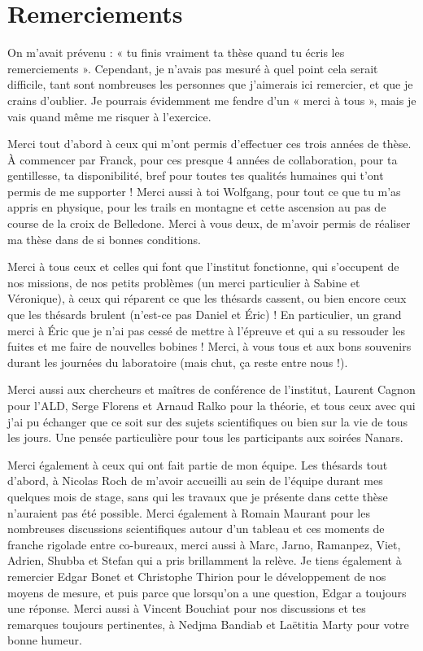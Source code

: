 \section*{Remerciements}

On m'avait prévenu : « tu finis vraiment ta thèse quand tu écris les remerciements ». Cependant, je n'avais pas mesuré à quel point cela serait difficile, tant sont nombreuses les personnes que j'aimerais ici remercier, et que je crains d'oublier. Je pourrais évidemment me fendre d'un « merci à tous », mais je vais quand même me risquer à l'exercice.


Merci tout d'abord à ceux qui m'ont permis d'effectuer ces trois années de thèse. À commencer par Franck, pour ces presque 4 années de collaboration, pour ta gentillesse, ta disponibilité, bref pour toutes tes qualités humaines qui t'ont permis de me supporter ! Merci aussi à toi Wolfgang, pour tout ce que tu m'as appris en physique, pour les trails en montagne et cette ascension au pas de course de la croix de Belledone. Merci à vous deux, de m'avoir permis de réaliser ma thèse dans de si bonnes conditions.


Merci à tous ceux et celles qui font que l'institut fonctionne, qui s'occupent de nos missions, de nos petits problèmes (un merci particulier à Sabine et Véronique), à ceux qui réparent ce que les thésards cassent, ou bien encore ceux que les thésards brulent (n'est-ce pas Daniel et Éric) ! En particulier, un grand merci à Éric que je n'ai pas cessé de mettre à l'épreuve et qui a su ressouder les fuites et me faire de nouvelles bobines ! Merci, à vous tous et aux bons souvenirs durant les journées du laboratoire (mais chut, ça reste entre nous !).


Merci aussi aux chercheurs et maîtres de conférence de l'institut, Laurent Cagnon pour l'ALD, Serge Florens et Arnaud Ralko pour la théorie, et tous ceux avec qui j'ai pu échanger que ce soit sur des sujets scientifiques ou bien sur la vie de tous les jours. Une pensée particulière pour tous les participants aux soirées Nanars.


Merci également à ceux qui ont fait partie de mon équipe. Les thésards tout d'abord, à Nicolas Roch de m'avoir accueilli au sein de l'équipe durant mes quelques mois de stage, sans qui les travaux que je présente dans cette thèse n'auraient pas été possible. Merci également à Romain Maurant pour les nombreuses discussions scientifiques autour d'un tableau et ces moments de franche rigolade entre co-bureaux, merci aussi à Marc, Jarno, Ramanpez, Viet, Adrien, Shubba et Stefan qui a pris brillamment la relève. Je tiens également à remercier Edgar Bonet et Christophe Thirion pour le développement de nos moyens de mesure, et puis parce que lorsqu'on a une question, Edgar a toujours une réponse. Merci aussi à Vincent Bouchiat pour nos discussions et tes remarques toujours pertinentes, à Nedjma Bandiab et Laëtitia Marty pour votre bonne humeur.


